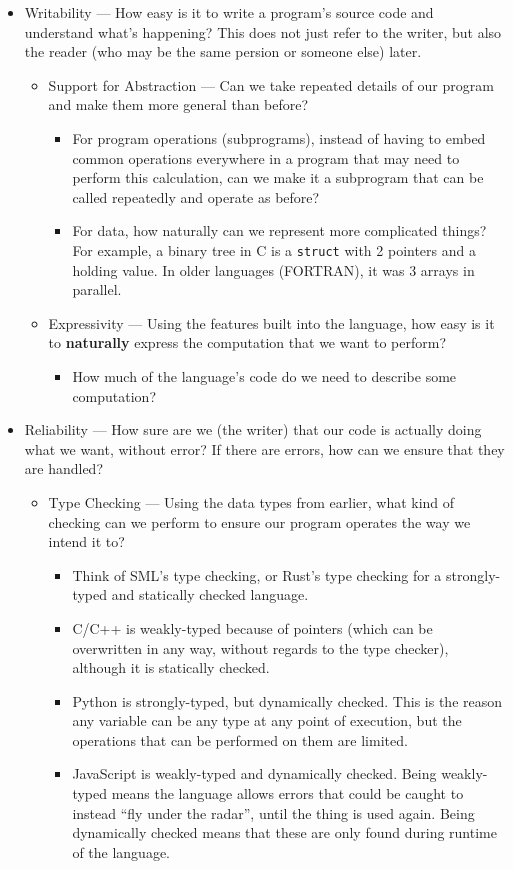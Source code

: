\begin{itemize}
\item Writability --- How easy is it to write a program's source code and understand what's happening?
  This does not just refer to the writer, but also the reader (who may be the same persion or someone else) later.
  \begin{itemize}
  \item Support for Abstraction --- Can we take repeated details of our program and make them more general than before?
    \begin{itemize}[noitemsep]
    \item For program operations (subprograms), instead of having to embed common operations everywhere in a program that may need to perform this calculation, can we make it a subprogram that can be called repeatedly and operate as before?
    \item For data, how naturally can we represent more complicated things? For example, a binary tree in C is a \texttt{struct} with 2 pointers and a holding value. In older languages (FORTRAN), it was 3 arrays in parallel.
    \end{itemize}

  \item Expressivity --- Using the features built into the language, how easy is it to \textbf{naturally} express the computation that we want to perform?
    \begin{itemize}[noitemsep]
    \item How much of the language's code do we need to describe some computation?
    \end{itemize}
  \end{itemize}

\item Reliability --- How sure are we (the writer) that our code is actually doing what we want, without error? If there are errors, how can we ensure that they are handled?
  \begin{itemize}
  \item Type Checking --- Using the data types from earlier, what kind of checking can we perform to ensure our program operates the way we intend it to?
    \begin{itemize}[noitemsep]
    \item Think of SML's type checking, or Rust's type checking for a strongly-typed and statically checked language.
    \item C/C++ is weakly-typed because of pointers (which can be overwritten in any way, without regards to the type checker), although it is statically checked.
    \item Python is strongly-typed, but dynamically checked. This is the reason any variable can be any type at any point of execution, but the operations that can be performed on them are limited.
    \item JavaScript is weakly-typed and dynamically checked. Being weakly-typed means the language allows errors that could be caught to instead ``fly under the radar'', until the thing is used again. Being dynamically checked means that these are only found during runtime of the language.
    \end{itemize}


\end{itemize}
\end{itemize}
